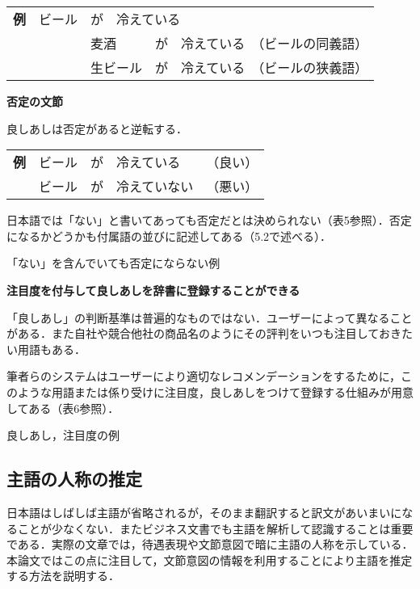 \documentclass[japanese]{jnlp_1.4}
\begin{document}
\vspace{0.3zw}
\begin{tabular}{lll}
{\bfseries 例} & ビール & が　冷えている \\
	& & 麦酒　　　が　冷えている　（ビールの同義語）\\
	& & 生ビール　が　冷えている　（ビールの狭義語）
\end{tabular}
\vspace{0.3zw}

{\bfseries 否定の文節}

良しあしは否定があると逆転する．

\vspace{0.3zw}
\begin{tabular}{lllll}
{\bfseries 例} & ビール & が & 冷えている & （良い）\\
	& ビール & が & 冷えていない & （悪い）
\end{tabular}
\vspace{0.3zw}

日本語では「ない」と書いてあっても否定だとは決められない（表5参照）．否定になるかどうかも付属語の並びに記述してある（5.2で述べる）．


\begin{table}[b]
 \caption{「ない」を含んでいても否定にならない例}

\end{table}


{\bfseries 注目度を付与して良しあしを辞書に登録することができる}

「良しあし」の判断基準は普遍的なものではない．ユーザーによって異なることがある．また自社や競合他社の商品名のようにその評判をいつも注目しておきたい用語もある．

筆者らのシステムはユーザーにより適切なレコメンデーションをするために，このような用語または係り受けに注目度，良しあしをつけて登録する仕組みが用意してある（表6参照）．

\begin{table}[t]
 \caption{良しあし，注目度の例}

\end{table}



\subsection{主語の人称の推定}

日本語はしばしば主語が省略されるが，そのまま翻訳すると訳文があいまいになることが少なくない．またビジネス文書でも主語を解析して認識することは重要である．実際の文章では，待遇表現や文節意図で暗に主語の人称を示している．本論文ではこの点に注目して，文節意図の情報を利用することにより主語を推定する方法を説明する．
\end{document}
